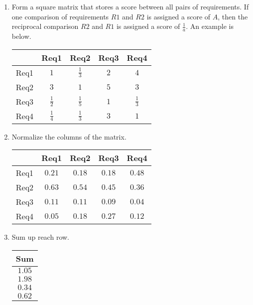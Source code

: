 \documentclass[12pt,titlepage]{article}
\begin{document}
        \begin{enumerate}
          \item
            Form a square matrix that stores a score between all pairs of requirements. If one comparison of requirements $R1$ and $R2$ is assigned a score of
            $A$, then the reciprocal comparison $R2$ and $R1$ is assigned a score of $\frac{1}{a}$. An example is below.
            \begin{center}
              \begin{tabular}{ |c|c|c|c|c| } 
                \hline
                     & Req1 & Req2 & Req3 & Req4 \\ 
                \hline
                Req1 & $1$ & $\frac{1}{3}$ & $2$ & $4$ \\ 
                \hline
                Req2 & $3$ & $1$ & $5$ & $3$ \\ 
                \hline
                Req3 & $\frac{1}{2}$ & $\frac{1}{5}$ & $1$ & $\frac{1}{3}$ \\ 
                \hline
                Req4 & $\frac{1}{4}$ & $\frac{1}{3}$ & $3$ & $1$ \\ 
                \hline
              \end{tabular}
            \end{center}

          \item Normalize the columns of the matrix.
            \begin{center}
              \begin{tabular}{ |c|c|c|c|c| } 
                \hline
                     & Req1 & Req2 & Req3 & Req4 \\ 
                \hline
                Req1 & $0.21$ & $0.18$ & $0.18$ & $0.48$ \\ 
                \hline
                Req2 & $0.63$ & $0.54$ & $0.45$ & $0.36$ \\ 
                \hline
                Req3 & $0.11$ & $0.11$ & $0.09$ & $0.04$ \\ 
                \hline
                Req4 & $0.05$ & $0.18$ & $0.27$ & $0.12$ \\ 
                \hline
              \end{tabular}
            \end{center}

          \item Sum up reach row.
            \begin{center}
              \begin{tabular}{ |c| } 
                \hline
                Sum \\ 
                \hline
                $1.05$ \\
                \hline
                $1.98$ \\
                \hline
                $0.34$ \\
                \hline
                $0.62$ \\
                \hline
              \end{tabular}
            \end{center}


\end{enumerate}
\end{document}
